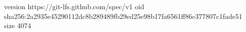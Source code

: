version https://git-lfs.github.com/spec/v1
oid sha256:2a2935e45290112dc8b289489fb29ed25e98b17fa6561ff86c377807c1fade51
size 4074
